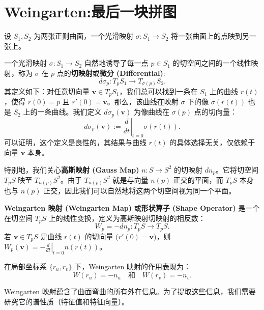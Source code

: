 \documentclass[lang=cn,10pt,thmcnt=section]{elegantbook}
\renewcommand{\vec}[1]{\mathbf{#1}}
\begin{document}
\section{Weingarten:最后一块拼图}
\begin{definition}[正则曲面间的映射]
    设 $S_1, S_2$ 为两张正则曲面，一个光滑映射 $\sigma: S_1 \to S_2$ 将一张曲面上的点映到另一张上。
\end{definition}

\begin{definition}
    一个光滑映射 $\sigma: S_1 \to S_2$ 自然地诱导了每一点 $p \in S_1$ 的切空间之间的一个线性映射，称为 $\sigma$ 在 $p$ 点的\textbf{切映射}或\textbf{微分 (Differential)}:
    \[
    d\sigma_p: T_p S_1 \to T_{\sigma(p)} S_2.
    \]
    其定义如下：对任意切向量 $\vec{v} \in T_pS_1$，我们总可以找到一条在 $S_1$ 上的曲线 $r(t)$，使得 $r(0) = p$ 且 $r'(0) = \vec{v}$。那么，该曲线在映射 $\sigma$ 下的像 $\sigma(r(t))$ 也是 $S_2$ 上的一条曲线。我们定义 $d\sigma_p(\vec{v})$ 为像曲线在 $\sigma(p)$ 点的切向量：
    \[
    d\sigma_p(\vec{v}) := \left.\frac{d}{dt}\right|_{t=0} \sigma(r(t)).
    \]
    可以证明，这个定义是良性的，其结果与曲线 $r(t)$ 的具体选择无关，仅依赖于向量 $\vec{v}$ 本身。
\end{definition}

\noindent 特别地，我们关心\textbf{高斯映射 (Gauss Map)} $n: S \to S^2$ 的切映射 $dn_p$。它将切空间 $T_pS$ 映至 $T_{n(p)}S^2$。由于 $T_{n(p)}S^2$ 就是与向量 $n(p)$ 正交的平面，而 $T_pS$ 本身也与 $n(p)$ 正交，因此我们可以自然地将这两个切空间视为同一个平面。

\begin{definition}[Weingarten 映射]
    \textbf{Weingarten 映射 (Weingarten Map)} 或\textbf{形状算子 (Shape Operator)} 是一个在切空间 $T_pS$ 上的线性变换，定义为高斯映射切映射的相反数：
    \[
    W_p = -dn_p : T_pS \to T_pS.
    \]
    若 $\vec{v} \in T_pS$ 是曲线 $r(t)$ 的切向量 ($r'(0)=\vec{v}$)，则 $W_p(\vec{v}) = -\left.\frac{d}{dt}\right|_{t=0} n(r(t))$。
    
    在局部坐标系 $\{r_u, r_v\}$ 下，Weingarten 映射的作用表现为：
    \[
    W(r_u) = -n_u \quad \text{和} \quad W(r_v) = -n_v.
    \]
\end{definition}
Weingarten 映射蕴含了曲面弯曲的所有外在信息。为了提取这些信息，我们需要研究它的谱性质（特征值和特征向量）。
\end{document}

